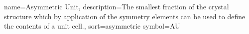 
{
  name=Asymmetric Unit,
  description={The smallest fraction of the crystal structure which by application of the symmetry elements can be used to define the contents of a unit cell.},
  sort=asymmetric
  symbol={AU}
}
